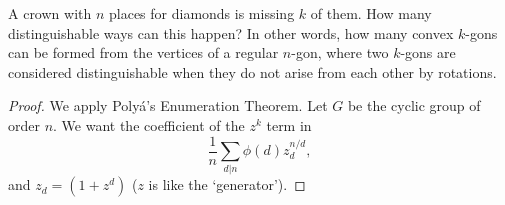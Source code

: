 \documentclass[11pt]{article}
\begin{document}
\begin{quest}
    A crown with $n$ places for diamonds is missing $k$ of them. How many distinguishable ways can this happen? In other words, how many convex $k$-gons can be formed from the vertices of a regular $n$-gon, where two $k$-gons are considered distinguishable when they do not arise from each other by rotations.
\end{quest}
\begin{proof}
    We apply Polyá's Enumeration Theorem. Let $G$ be the cyclic group of order $n$. We want the coefficient of the $z^k$ term in \[\frac{1}{n}\sum_{d|n}\phi(d)z_d^{n/d},\] and $z_d=(1+z^d)$ ($z$ is like the `generator').
\end{proof}
\end{document}
